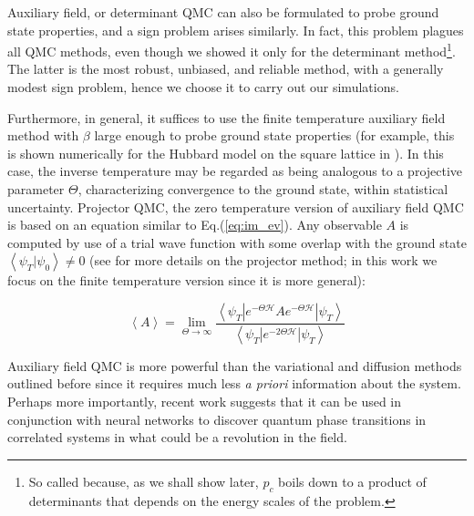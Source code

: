 Auxiliary field, or determinant \acs{QMC} can also be formulated to probe ground state properties, and a sign problem arises similarly.
In fact, this problem plagues all \acs{QMC} methods, even though we showed it only for the determinant method\footnote{So called because, as we shall show later, $p_c$ boils down to a product of determinants that depends on the energy scales of the problem.}.
The latter is the most robust, unbiased, and reliable method, with a generally modest sign problem, hence we choose it to carry out our simulations.

Furthermore, in general, it suffices to use the finite temperature auxiliary field  method with $\beta$ large enough to probe ground state properties (for example, this is shown numerically for the Hubbard model on the square lattice in \cite{white_numerical_1989}).
In this case, the inverse temperature may be regarded as being analogous to a  projective parameter $\Theta$, characterizing convergence to the ground state, within statistical uncertainty.
Projector \ac{QMC}, the zero temperature version of auxiliary field \ac{QMC} is based on an equation similar to Eq.(\ref{eq:im_ev}).
Any observable $A$ is computed by use of a trial wave function with some overlap with the ground state $\left\langle \psi_T | \psi_0 \right\rangle \neq 0$ (see \cite{f._assaad_quantum_2002} for more details on the projector method; in this work we focus on the finite temperature version since it is more general):

\begin{equation}
\left\langle A \right\rangle = \lim_{\Theta \rightarrow \infty} \frac{\left\langle \psi_T | e^{-\Theta \mathcal{H} } A e^{-\Theta \mathcal{H} } | \psi_T \right\rangle }{\left\langle \psi_T | e^{- 2 \Theta \mathcal{H} } | \psi_T \right\rangle}
\end{equation}

Auxiliary field \ac{QMC} is more powerful than the variational and diffusion methods outlined before since it requires much less \emph{a priori} information about the system.
Perhaps more importantly, recent work suggests that it can be used in conjunction with neural networks to discover quantum phase transitions in correlated systems  \cite{broecker_machine_2017} in what could be a revolution in the field.